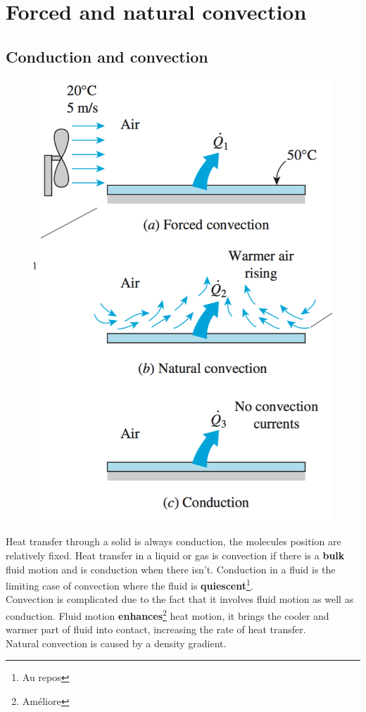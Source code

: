 
\chapter{Forced and natural convection}
\section{Conduction and convection}
	\begin{figure}
	\vspace{-5mm}
	\includegraphics[scale=0.25]{ch5/1}
	\end{figure}	
	Heat transfer through a solid is always conduction, the molecules position are relatively fixed. Heat transfer in a liquid or gas is convection if there is a \textbf{bulk} fluid motion and is conduction when there isn't. Conduction in a fluid is the limiting case of convection where the fluid is \textbf{quiescent}\footnote{Au repos}.  \\
	Convection is complicated due to the fact that it involves fluid motion as well as conduction. Fluid motion \textbf{enhances}\footnote{Améliore} heat motion, it brings the cooler and warmer part of fluid into contact, increasing the rate of heat transfer. \\
	Natural convection is caused by a density gradient. 

